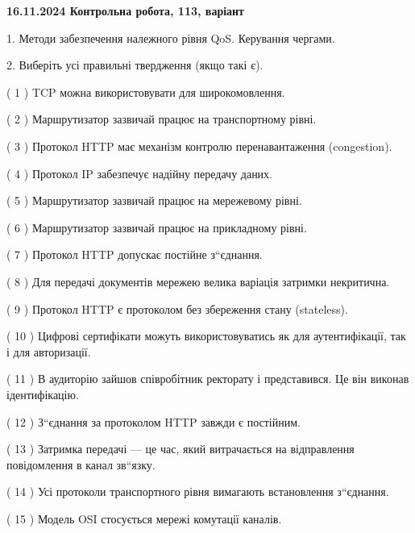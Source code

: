 \documentclass[12pt, ukrainian]{article}
\begin{document}
\vspace{4mm}
\newpage
\begin {large}

\textbf{16.11.2024 Контрольна робота, 113, варіант  }\par


{
1. Методи забезпечення належного рівня QoS. Керування чергами.



\vspace{5mm}
2. Виберіть усі правильні твердження (якщо такі є).\par
\vspace{2mm}

( 1 ) TCP можна використовувати для широкомовлення.

( 2 ) Маршрутизатор зазвичай працює на транспортному рівні.

( 3 ) Протокол HTTP має механізм контролю перенавантаження (congestion).

( 4 ) Протокол IP забезпечує надійну передачу даних.

( 5 ) Маршрутизатор зазвичай працює на мережевому рівні.

( 6 ) Маршрутизатор зазвичай працює на прикладному рівні.

( 7 ) Протокол  HTTP допускає постійне з“єднання.

( 8 ) Для передачі документів мережею велика варіація затримки некритична.

( 9 ) Протокол  HTTP є протоколом без збереження стану (stateless).

( 10 ) Цифрові сертифікати можуть використовуватись як для аутентифікації, так і для авторизації.

( 11 ) В аудиторію зайшов співробітник ректорату і представився. Це він виконав ідентифікацію.

( 12 ) З“єднання за протоколом  HTTP завжди є постійним.

( 13 ) Затримка передачі — це час, який витрачається на відправлення повідомлення в канал зв“язку.

( 14 ) Усі протоколи транспортного рівня вимагають встановлення з“єднання.

( 15 ) Модель OSI стосується мережі комутації каналів.
}
\end {large}
\end{document}
